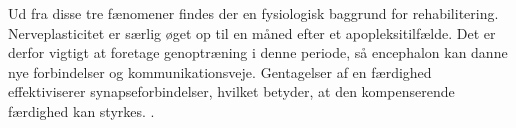 Ud fra disse tre fænomener findes der en fysiologisk baggrund for rehabilitering. Nerveplasticitet er særlig øget op til en måned efter et apopleksitilfælde. Det er derfor vigtigt at foretage genoptræning i denne periode, så encephalon kan danne nye forbindelser og kommunikationsveje. \cite{Rugnett2015} Gentagelser af en færdighed effektiviserer synapseforbindelser, hvilket betyder, at den kompenserende færdighed kan styrkes. \cite{Stanfield2014}.




